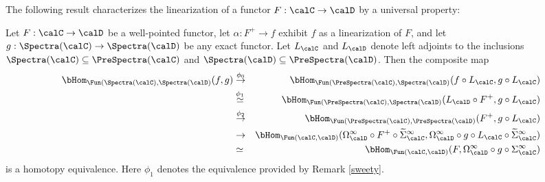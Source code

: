 The following result characterizes the linearization of a functor $F: \calC \rightarrow \calD$ by a universal property:

\begin{proposition}\label{swuft}
Let $F: \calC \rightarrow \calD$ be a well-pointed functor, let $\alpha: F^{+} \rightarrow f$ exhibit
$f$ as a linearization of $F$, and let $g: \Spectra(\calC) \rightarrow \Spectra(\calD)$ be any exact functor. Let $L_{\calC}$ and $L_{\calD}$ denote left adjoints to the inclusions
$\Spectra(\calC) \subseteq \PreSpectra(\calC)$ and $\Spectra(\calD) \subseteq \PreSpectra(\calD)$.
Then the composite map
\begin{align*}
\bHom_{ \Fun( \Spectra(\calC), \Spectra(\calD)}(f,g) & \stackrel{\phi_0}{\rightarrow} & 
\bHom_{ \Fun( \PreSpectra(\calC), \Spectra(\calD)}( f \circ L_{\calC}, g \circ L_{\calC} ) \\
& \stackrel{\phi_1}{\simeq} & \bHom_{ \Fun( \PreSpectra(\calC), \Spectra(\calD)}( L_{\calD} \circ F^{+}, g \circ L_{\calC} ) \\
& \stackrel{\phi_2}{\rightarrow} & \bHom_{ \Fun( \PreSpectra(\calC), \PreSpectra(\calD)}( F^{+}, g \circ L_{\calC}) \\
& \rightarrow & \bHom_{ \Fun(\calC, \calD)}( \Omega^{\infty}_{\calD} \circ F^{+} \circ \widetilde{\Sigma}^{\infty}_{\calC}, \Omega^{\infty}_{\calD} \circ g \circ L_{\calC} \circ \widetilde{\Sigma}^{\infty}_{\calC}) \\
& \simeq & \bHom_{ \Fun(\calC, \calD)}( F, \Omega^{\infty}_{\calD} \circ g \circ \Sigma^{\infty}_{\calC})
\end{align*}
is a homotopy equivalence. Here $\phi_1$ denotes the equivalence provided by Remark \ref{sweety}.
\end{proposition}

